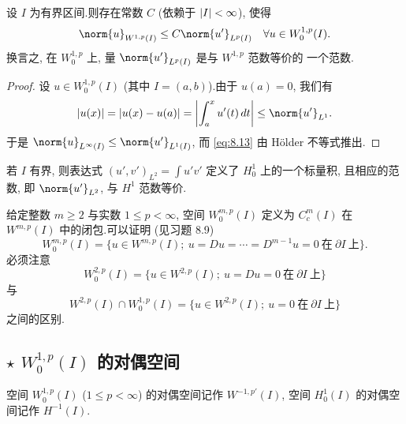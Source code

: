 \begin{keyproposition}
\label{prop:8.13}
设 $I$ 为有界区间.则存在常数 $C$ (依赖于 $\left|I\right|<\infty$), 使得
\begin{equation}
\norm{u}_{W^{1,p}(I)}\le C\norm{u'}_{L^p(I)}\quad\forall u\in W_0^{1,p}(I).
\label{eq:8.13}
\end{equation}
换言之, 在 $W_0^{1,p}$ 上, 量 $\norm{u'}_{L^p(I)}$ 是与 $W^{1,p}$ 范数等价的
一个范数.
\end{keyproposition}

\begin{proof}
设 $u\in W_0^{1,p}(I)$ (其中 $I=(a,b)$).由于 $u(a)=0$, 我们有
\begin{equation*}
\abs{u(x)}=\abs{u(x)-u(a)}=\abs{\int_a^x u'(t)\,dt}\le\norm{u'}_{L^1}.
\end{equation*}
于是 $\norm{u}_{L^\infty(I)}\le\norm{u'}_{L^1(I)}$, 而 \eqref{eq:8.13} 由
Hölder 不等式推出.
\end{proof}

\begin{remark}
\label{rem:8.17}
若 $I$ 有界, 则表达式 $(u',v')_{L^2}=\int u'v'$ 定义了 $H_0^1$ 上的一个标量积,
且相应的范数, 即 $\norm{u'}_{L^2}$, 与 $H^1$ 范数等价.
\end{remark}

\begin{remark}
\label{rem:8.18}
给定整数 $m\ge2$ 与实数 $1\le p<\infty$, 空间 $W_0^{m,p}(I)$ 定义为
$C_c^m(I)$ 在 $W^{m,p}(I)$ 中的闭包.可以证明 (见习题 8.9)
\begin{equation*}
W_0^{m,p}(I)=\{u\in W^{m,p}(I);\ u=Du=\cdots=D^{m-1}u=0
\ \text{在}\ \partial I\ \text{上}\}.
\end{equation*}
必须注意
\begin{equation*}
W_0^{2,p}(I)=\{u\in W^{2,p}(I);\ u=Du=0\ \text{在}\ \partial I\ \text{上}\}
\end{equation*}
与
\begin{equation*}
W^{2,p}(I)\cap W_0^{1,p}(I)=\{u\in W^{2,p}(I);\ u=0\ \text{在}\ \partial I\ \text{上}\}
\end{equation*}
之间的区别.
\end{remark}

\subsection*{$\star$ $W_0^{1,p}(I)$ 的对偶空间}

\begin{notation}
空间 $W_0^{1,p}(I)$ ($1\le p<\infty$) 的对偶空间记作 $W^{-1,p'}(I)$, 空间
$H_0^1(I)$ 的对偶空间记作 $H^{-1}(I)$.
\end{notation}

